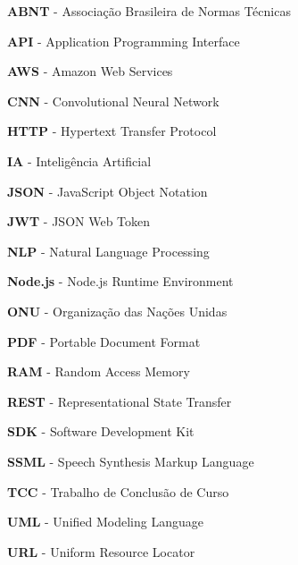 \makeatletter
{}
\makeatother

\renewcommand{\baselinestretch}{1.5}\selectfont
\setlength{\parskip}{0pt}

\begin{flushleft}

\textbf{ABNT} - Associação Brasileira de Normas Técnicas

\textbf{API} - Application Programming Interface

\textbf{AWS} - Amazon Web Services

\textbf{CNN} - Convolutional Neural Network


\textbf{HTTP} - Hypertext Transfer Protocol

\textbf{IA} - Inteligência Artificial

\textbf{JSON} - JavaScript Object Notation

\textbf{JWT} - JSON Web Token

\textbf{NLP} - Natural Language Processing

\textbf{Node.js} - Node.js Runtime Environment

\textbf{ONU} - Organização das Nações Unidas

\textbf{PDF} - Portable Document Format

\textbf{RAM} - Random Access Memory

\textbf{REST} - Representational State Transfer

\textbf{SDK} - Software Development Kit

\textbf{SSML} - Speech Synthesis Markup Language

\textbf{TCC} - Trabalho de Conclusão de Curso

\textbf{UML} - Unified Modeling Language

\textbf{URL} - Uniform Resource Locator


\end{flushleft}

\renewcommand{\baselinestretch}{1.0}\selectfont
\setlength{\parskip}{\baselineskip}
